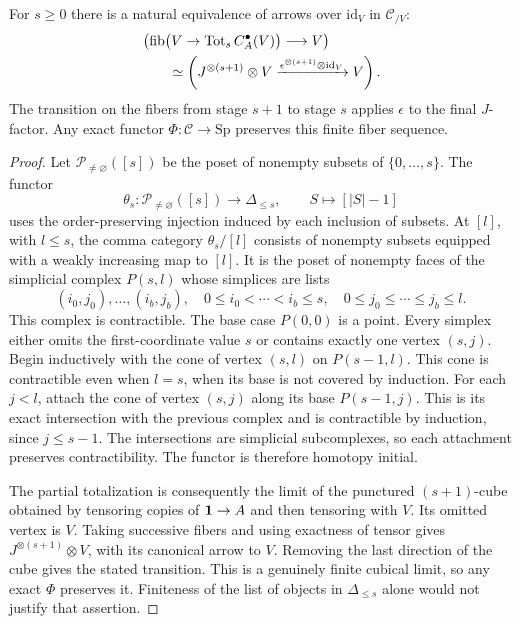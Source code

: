 \begin{lemma}\label{lem:cube}
For $s\geq0$ there is a natural equivalence of arrows over $\mathrm{id}_V$
in $\mathcal C_{/V}$:
\[
 \begin{aligned}
 &\left(\operatorname{fib}\bigl(V\to\operatorname{Tot}_s C_A^\bullet(V)\bigr)\longrightarrow V\right)\\
 &\qquad\simeq\left(J^{\otimes(s+1)}\otimes V
 \xrightarrow{\epsilon^{\otimes(s+1)}\otimes\mathrm{id}_V}V\right).
 \end{aligned}
\]
The transition on the fibers from stage $s+1$ to stage $s$ applies
$\epsilon$ to the final $J$-factor. Any exact functor
$\Phi:\mathcal C\to\mathrm{Sp}$ preserves this finite fiber sequence.
\end{lemma}
\begin{proof}
Let $\mathcal P_{\ne\varnothing}([s])$ be the poset of nonempty
subsets of $\{0,\ldots,s\}$. The functor
\[
 \theta_s:\mathcal P_{\ne\varnothing}([s])\longrightarrow\Delta_{\leq s},
 \qquad S\longmapsto[|S|-1]
\]
uses the order-preserving injection induced by each inclusion of subsets.
At $[l]$, with $l\leq s$, the comma category $\theta_s/[l]$ consists of
nonempty subsets equipped with a weakly increasing map to $[l]$. It is
the poset of nonempty faces of the simplicial complex $P(s,l)$ whose
simplices are lists
\[
 (i_0,j_0),\ldots,(i_b,j_b),\quad
 0\leq i_0<\cdots<i_b\leq s,\quad
 0\leq j_0\leq\cdots\leq j_b\leq l.
\]
This complex is contractible. The base case $P(0,0)$ is a point.
Every simplex either omits the first-coordinate value $s$ or contains
exactly one vertex $(s,j)$. Begin inductively with the cone of vertex
$(s,l)$ on $P(s-1,l)$.
This cone is contractible even when $l=s$, when its base is not covered
by induction. For each $j<l$, attach the cone of vertex $(s,j)$ along
its base $P(s-1,j)$. This is its exact intersection with the previous
complex and is contractible by induction, since $j\leq s-1$.
The intersections are simplicial subcomplexes, so each attachment
preserves contractibility. The functor is therefore
homotopy initial.

The partial totalization is consequently the limit of the punctured
$(s+1)$-cube obtained by tensoring copies of $\mathbf 1\to A$ and then
tensoring with $V$. Its omitted vertex is $V$. Taking successive fibers
and using exactness of tensor gives $J^{\otimes(s+1)}\otimes V$,
with its canonical arrow to $V$. Removing the last direction of the
cube gives the stated transition. This is a genuinely finite cubical
limit, so any exact $\Phi$ preserves it. Finiteness of the list of
objects in $\Delta_{\leq s}$ alone would not justify that assertion.
\end{proof}

